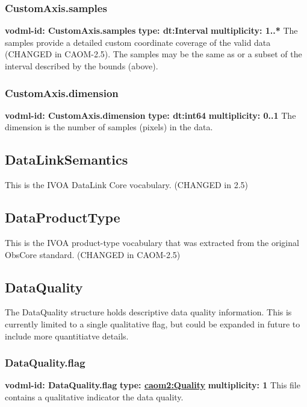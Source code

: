     \subsubsection{CustomAxis.samples}
      \textbf{vodml-id: CustomAxis.samples} \newline
      \textbf{type: dt:Interval} \newline
      \textbf{multiplicity: 1..*} \newline
      The samples provide a detailed custom coordinate coverage of the valid data (CHANGED in CAOM-2.5). The samples may be the same as or a subset of the interval described by the bounds (above).

    \subsubsection{CustomAxis.dimension}
      \textbf{vodml-id: CustomAxis.dimension} \newline
      \textbf{type: dt:int64} \newline
      \textbf{multiplicity: 0..1} \newline
      The dimension is the number of samples (pixels) in the data.

  \subsection{DataLinkSemantics}
  \label{sect:DataLinkSemantics}
    This is the IVOA DataLink Core vocabulary. (CHANGED in 2.5)

  \subsection{DataProductType}
  \label{sect:DataProductType}
    This is the IVOA product-type vocabulary that was extracted from the original ObsCore standard. (CHANGED in CAOM-2.5)

  \subsection{DataQuality}
  \label{sect:DataQuality}
    The DataQuality structure holds descriptive data quality information. This is currently limited to a single qualitative flag, but could be expanded in future to include more quantitiatve details.

    \subsubsection{DataQuality.flag}
      \textbf{vodml-id: DataQuality.flag} \newline
      \textbf{type: \hyperref[sect:Quality]{caom2:Quality}} \newline
      \textbf{multiplicity: 1} \newline
      This file contains a qualitative indicator the data quality.

